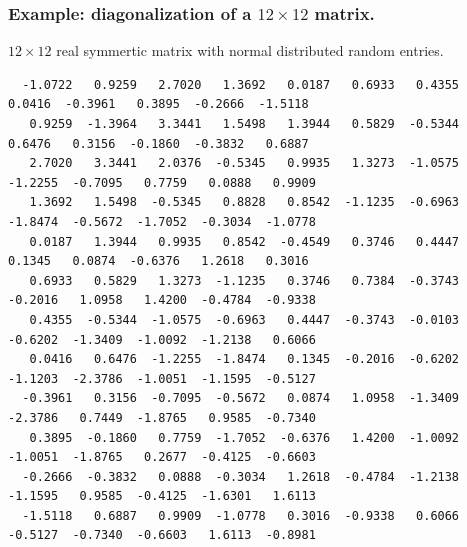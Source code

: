 \subsubsection*{Example: diagonalization of a $12\times12$ matrix.}
$12\times12$ real symmertic matrix with normal distributed random entries. 
{\scriptsize
\begin{verbatim}
  -1.0722   0.9259   2.7020   1.3692   0.0187   0.6933   0.4355   0.0416  -0.3961   0.3895  -0.2666  -1.5118
   0.9259  -1.3964   3.3441   1.5498   1.3944   0.5829  -0.5344   0.6476   0.3156  -0.1860  -0.3832   0.6887
   2.7020   3.3441   2.0376  -0.5345   0.9935   1.3273  -1.0575  -1.2255  -0.7095   0.7759   0.0888   0.9909
   1.3692   1.5498  -0.5345   0.8828   0.8542  -1.1235  -0.6963  -1.8474  -0.5672  -1.7052  -0.3034  -1.0778
   0.0187   1.3944   0.9935   0.8542  -0.4549   0.3746   0.4447   0.1345   0.0874  -0.6376   1.2618   0.3016
   0.6933   0.5829   1.3273  -1.1235   0.3746   0.7384  -0.3743  -0.2016   1.0958   1.4200  -0.4784  -0.9338
   0.4355  -0.5344  -1.0575  -0.6963   0.4447  -0.3743  -0.0103  -0.6202  -1.3409  -1.0092  -1.2138   0.6066
   0.0416   0.6476  -1.2255  -1.8474   0.1345  -0.2016  -0.6202  -1.1203  -2.3786  -1.0051  -1.1595  -0.5127
  -0.3961   0.3156  -0.7095  -0.5672   0.0874   1.0958  -1.3409  -2.3786   0.7449  -1.8765   0.9585  -0.7340
   0.3895  -0.1860   0.7759  -1.7052  -0.6376   1.4200  -1.0092  -1.0051  -1.8765   0.2677  -0.4125  -0.6603
  -0.2666  -0.3832   0.0888  -0.3034   1.2618  -0.4784  -1.2138  -1.1595   0.9585  -0.4125  -1.6301   1.6113
  -1.5118   0.6887   0.9909  -1.0778   0.3016  -0.9338   0.6066  -0.5127  -0.7340  -0.6603   1.6113  -0.8981
\end{verbatim}
}
